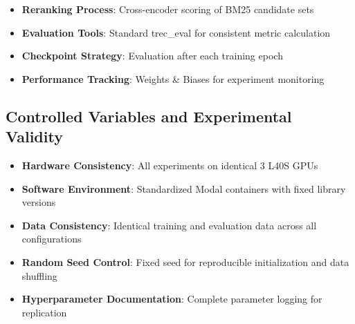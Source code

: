 \begin{itemize}
    \item \textbf{Reranking Process}: Cross-encoder scoring of BM25 candidate sets
    \item \textbf{Evaluation Tools}: Standard trec\_eval for consistent metric calculation
    \item \textbf{Checkpoint Strategy}: Evaluation after each training epoch
    \item \textbf{Performance Tracking}: Weights \& Biases for experiment monitoring
\end{itemize}

\subsection{Controlled Variables and Experimental Validity}

\begin{itemize}
    \item \textbf{Hardware Consistency}: All experiments on identical 3 L40S GPUs
    \item \textbf{Software Environment}: Standardized Modal containers with fixed library versions
    \item \textbf{Data Consistency}: Identical training and evaluation data across all configurations
    \item \textbf{Random Seed Control}: Fixed seed for reproducible initialization and data shuffling
    \item \textbf{Hyperparameter Documentation}: Complete parameter logging for replication
\end{itemize}


